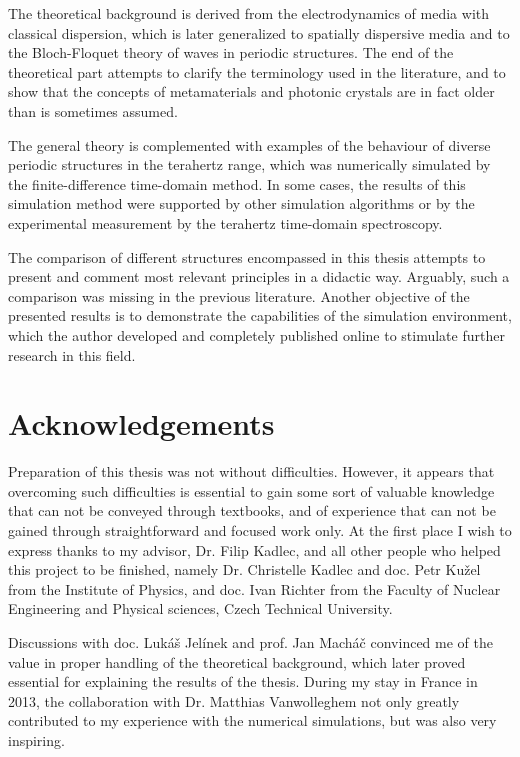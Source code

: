 The theoretical background is derived from the electrodynamics of media with classical dispersion, which is later generalized to spatially dispersive media and to the Bloch-Floquet theory of waves in periodic structures. The end of the theoretical part attempts to clarify the terminology used in the literature, and to show that the concepts of metamaterials and photonic crystals are in fact older than is sometimes assumed.

The general theory is complemented with examples of the behaviour of diverse periodic structures in the terahertz range, which was numerically simulated by the finite-difference time-domain method. In some cases, the results of this simulation method were supported by other simulation algorithms or by the experimental measurement by the terahertz time-domain spectroscopy. 

The comparison of different structures encompassed in this thesis attempts to present and comment most relevant principles in a didactic way. Arguably, such a comparison was missing in the previous literature.
Another objective of the presented results is to demonstrate the capabilities of the simulation environment, which the author developed and completely published online to stimulate further research in this field. 



\thispagestyle{empty} \newpage
\chapter*{Acknowledgements}
Preparation of this thesis was not without difficulties. However, it appears that overcoming such difficulties is essential to gain some sort of valuable knowledge that can not be conveyed through textbooks, and of experience that can not be gained through straightforward and focused work only.  At the first place I wish to express thanks to my advisor, Dr. Filip Kadlec, and all other people who helped this project to be finished, namely Dr. Christelle Kadlec and doc. Petr Ku\v{z}el  from the Institute of Physics, and doc. Ivan Richter from the Faculty of Nuclear Engineering and Physical sciences, Czech Technical University. 

Discussions with doc. Lukáš Jelínek and prof. Jan Macháč convinced me of the value in proper handling of the theoretical background, which later proved essential for explaining the results of the thesis. During my stay in France in 2013, the collaboration with Dr. Matthias Vanwolleghem not only greatly contributed to my experience with the numerical simulations, but was also very inspiring. 

